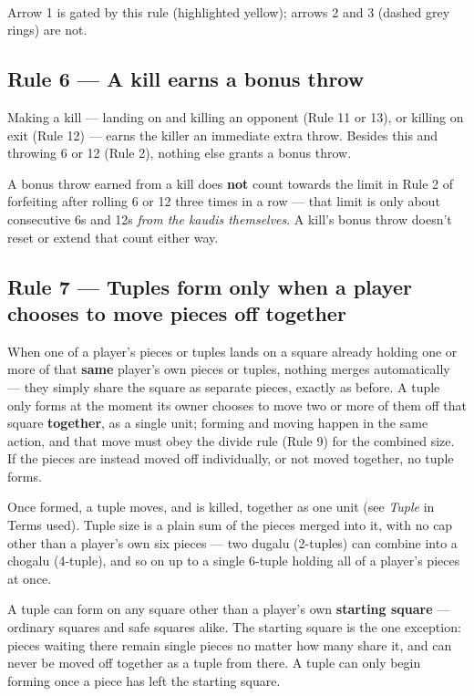 \documentclass[10pt,a4paper]{article}
\newcommand{\ruletitle}[2]{\subsection*{Rule #1 --- #2}}
\begin{document}
\begin{center}
  \\[1mm]
  {\small Arrow 1 is gated by this rule (highlighted yellow); arrows 2 and 3 (dashed grey rings) are not.}
\end{center}

\newpage
\ruletitle{6}{A kill earns a bonus throw}

Making a kill --- landing on and killing an opponent (Rule 11 or 13), or
killing on exit (Rule 12) --- earns the killer an immediate extra throw.
Besides this and throwing 6 or 12 (Rule 2), nothing else grants a bonus
throw.

A bonus throw earned from a kill does \textbf{not} count towards the limit
in Rule 2 of forfeiting after rolling 6 or 12 three times in a row --- that
limit is only about consecutive 6s and 12s \emph{from the kaudis
themselves}. A kill's bonus throw doesn't reset or extend that count either
way.

\ruletitle{7}{Tuples form only when a player chooses to move pieces off together}

When one of a player's pieces or tuples lands on a square already holding
one or more of that \textbf{same} player's own pieces or tuples, nothing
merges automatically --- they simply share the square as separate pieces,
exactly as before. A tuple only forms at the moment its owner chooses to
move two or more of them off that square \textbf{together}, as a single
unit; forming and moving happen in the same action, and that move must obey
the divide rule (Rule 9) for the combined size. If the pieces are instead
moved off individually, or not moved together, no tuple forms.

Once formed, a tuple moves, and is killed, together as one unit (see
\emph{Tuple} in Terms used). Tuple size is a plain sum of the pieces merged
into it, with no cap other than a player's own six pieces --- two dugalu
(2-tuples) can combine into a chogalu (4-tuple), and so on up to a single
6-tuple holding all of a player's pieces at once.

A tuple can form on any square other than a player's own \textbf{starting
square} --- ordinary squares and safe squares alike. The starting square is
the one exception: pieces waiting there remain single pieces no matter how
many share it, and can never be moved off together as a tuple from there. A
tuple can only begin forming once a piece has left the starting square.
\end{document}

